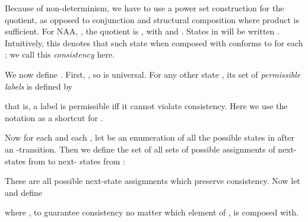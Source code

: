 \documentclass[twocolumn]{svjour3-dummy}
\newcommand*\NAA{NAA\xspace}
\begin{document}
Because of non-determinism, we have to use a power set construction for
the quotient, as opposed to conjunction and structural composition where
product is sufficient. For \NAA , , the quotient is , with  and .  States in  will be written .
Intuitively, this denotes that such state when composed with 
conforms to  for each ; we call this \emph{consistency} here.
 
We now define .  First, , so  is universal.  For any other state , its set of
\emph{permissible labels} is defined by

that is, a label is permissible iff it cannot violate consistency.  Here
we use the notation  as a shortcut for .

Now for each  and each , let
 be an enumeration of
all the possible states in  after an -transition.  Then we
define the set of all sets of possible assignments of next- states
from  to next- states from :

These are all possible next-state assignments which preserve
consistency.  Now let  and define

where , to
guarantee consistency no matter which element of , 
is composed with.
\end{document}
